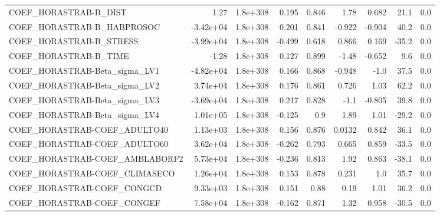 \begin{tabular}{lrrrrrrrr}
COEF\_HORASTRAB-B\_DIST             &        1.27 &     1.8e+308 &    0.195 &    0.846 &       1.78 &       0.682 &         21.1 &           0.0 \\
COEF\_HORASTRAB-B\_HABPROSOC        &   -3.42e+04 &     1.8e+308 &    0.201 &    0.841 &     -0.922 &      -0.904 &         40.2 &           0.0 \\
COEF\_HORASTRAB-B\_STRESS           &   -3.99e+04 &     1.8e+308 &   -0.499 &    0.618 &      0.866 &       0.169 &        -35.2 &           0.0 \\
COEF\_HORASTRAB-B\_TIME             &       -1.28 &     1.8e+308 &    0.127 &    0.899 &      -1.48 &      -0.652 &          9.6 &           0.0 \\
COEF\_HORASTRAB-Beta\_sigma\_LV1     &   -4.82e+04 &     1.8e+308 &    0.166 &    0.868 &     -0.948 &        -1.0 &         37.5 &           0.0 \\
COEF\_HORASTRAB-Beta\_sigma\_LV2     &    3.74e+04 &     1.8e+308 &    0.176 &    0.861 &      0.726 &        1.03 &         62.2 &           0.0 \\
COEF\_HORASTRAB-Beta\_sigma\_LV3     &   -3.69e+04 &     1.8e+308 &    0.217 &    0.828 &       -1.1 &      -0.805 &         39.8 &           0.0 \\
COEF\_HORASTRAB-Beta\_sigma\_LV4     &    1.01e+05 &     1.8e+308 &   -0.125 &      0.9 &       1.89 &        1.01 &        -29.2 &           0.0 \\
COEF\_HORASTRAB-COEF\_ADULTO40      &    1.13e+03 &     1.8e+308 &    0.156 &    0.876 &     0.0132 &       0.842 &         36.1 &           0.0 \\
COEF\_HORASTRAB-COEF\_ADULTO60      &    3.62e+04 &     1.8e+308 &   -0.262 &    0.793 &      0.665 &       0.859 &        -33.5 &           0.0 \\
COEF\_HORASTRAB-COEF\_AMBLABORF2    &    5.73e+04 &     1.8e+308 &   -0.236 &    0.813 &       1.92 &       0.863 &        -38.1 &           0.0 \\
COEF\_HORASTRAB-COEF\_CLIMASECO     &    1.26e+04 &     1.8e+308 &    0.153 &    0.878 &      0.231 &         1.0 &         35.7 &           0.0 \\
COEF\_HORASTRAB-COEF\_CONGCD        &    9.33e+03 &     1.8e+308 &    0.151 &     0.88 &       0.19 &        1.01 &         36.2 &           0.0 \\
COEF\_HORASTRAB-COEF\_CONGEF        &    7.58e+04 &     1.8e+308 &   -0.162 &    0.871 &       1.32 &       0.958 &        -30.5 &           0.0 \\

\end{tabular}
